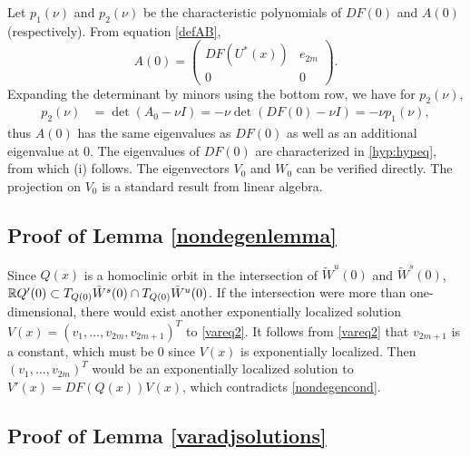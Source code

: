 \documentclass[10pt,reqno]{amsart}
\theoremstyle{plain}
\theoremstyle{definition}
\theoremstyle{remark}
\numberwithin{theorem}{section}
\numberwithin{equation}{section}
\begin{document}
Let $p_1(\nu)$ and $p_2(\nu)$ be the characteristic polynomials of $DF(0)$ and $A(0)$ (respectively). From equation \cref{defAB},
\begin{equation*}
A(0) = 
\begin{pmatrix}
DF(U^*(x)) & e_{2m}\\
0 & 0
\end{pmatrix}.
\end{equation*}
Expanding the determinant by minors using the bottom row, we have for $p_2(\nu)$,
\begin{align*}
p_2(\nu) &= \det(A_0 - \nu I) = -\nu \det(DF(0) - \nu I) = -\nu p_1(\nu),
\end{align*}
thus $A(0)$ has the same eigenvalues as $DF(0)$ as well as an additional eigenvalue at 0. The eigenvalues of $DF(0)$ are characterized in \cref{hyp:hypeq}, from which (i) follows. The eigenvectors $V_0$ and $W_0$ can be verified directly. The projection on $V_0$ is a standard result from linear algebra.

\subsection{Proof of Lemma \ref{nondegenlemma}}

Since $Q(x)$ is a homoclinic orbit in the intersection of $\tilde{W}^u(0)$ and $\tilde{W}^s(0)$, $\mathbb{R} Q'(0) \subset T_{Q(0)}\tilde{W}^s(0) \cap T_{Q(0)}\tilde{W}^u(0)$. If the intersection were more than one-dimensional, there would exist another exponentially localized solution $V(x) = (v_1, \dots, v_{2m}, v_{2m+1})^T$ to \eqref{vareq2}. It follows from \eqref{vareq2} that $v_{2m+1}$ is a constant, which must be 0 since $V(x)$ is exponentially localized. Then $(v_1, \dots, v_{2m})^T$ would be an exponentially localized solution to $V'(x) = DF(Q(x)) V(x)$, which contradicts \eqref{nondegencond}.

\subsection{Proof of Lemma \ref{varadjsolutions}}
\end{document}
